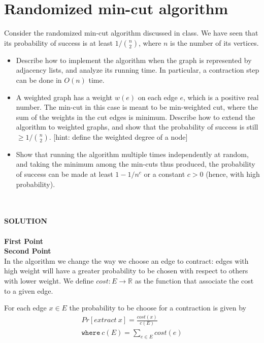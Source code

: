 \documentclass[a4paper]{article}
\begin{document}
\section*{Randomized min-cut algorithm}
Consider the randomized min-cut algorithm discussed in class.
We have seen that its probability of success is at least $1 / \binom{n}{2}$, where $n$ is the number of its vertices.
\begin{itemize}
\item Describe how to implement the algorithm when the graph is represented by adjacency lists, and analyze its running time.
In particular, a contraction step can be done in $O(n)$ time.
\item A weighted graph has a weight $w(e)$ on each edge $e$, which  is  a  positive  real number.
The  min-cut  in  this  case  is  meant  to  be  min-weighted  cut,  where  the sum  of  the  weights  in  the  cut  edges  is  minimum.
Describe  how  to  extend  the algorithm  to  weighted  graphs,  and  show  that  the  probability  of  success  is  still $\geq 1/\binom{n}{2}$. [hint: define the weighted degree of a node]
\item Show that running the algorithm multiple times independently at random, and taking the minimum among the min-cuts thus produced, the probability of success can be made at least $1 - 1/n^c$ or a constant $c > 0$ (hence, with high probability).
\end{itemize}
\
\\
\\
\textbf{SOLUTION}
\\
\\

\noindent
\textbf{First Point}
\\

\noindent
\textbf{Second Point}
\\

In the algorithm we change the way we choose an edge to contract: edges with high weight will have a greater probability to be chosen with respect to others with lower weight.
We define $cost: E \longrightarrow \mathbb{R}$ as the function that associate the cost to a given edge.

For each edge $x \in E$ the probability to be choose for a contraction is given by
\begin{align*}
Pr[extract\ x] = \frac{cost(x)}{c(E)}\\
\texttt{where} \ c(E) = \sum_{e \in E} cost(e)
\end{align*}
\end{document}
